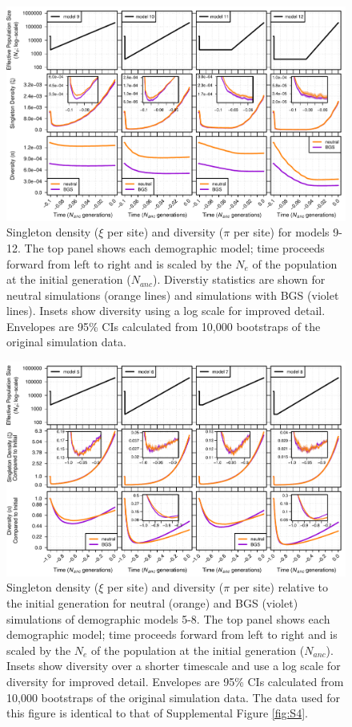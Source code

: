 \documentclass[9pt,twocolumn,twoside]{rilabRxiv}
\begin{document}
\begin{figure}[t]
\includegraphics[width=\linewidth]{figures/FigS5.pdf}
\caption{Singleton density ($\xi$ per site) and diversity ($\pi$ per site) for models 9-12.
The top panel shows each demographic model; time proceeds forward from left to right and is scaled by the $N_e$ of the population at the initial generation ($N_{anc}$).
Diverstiy statistics are shown for neutral simulations (orange lines) and simulations with BGS (violet lines).
Insets show diversity using a log scale for improved detail.
Envelopes are 95\% CIs calculated from 10,000 bootstraps of the original simulation data.}
\label{fig:S5}
\end{figure}
\pagebreak

\begin{figure}[h!]
\includegraphics[width=0.8\linewidth]{figures/FigS7.pdf}
\caption{Singleton density ($\xi$ per site) and diversity ($\pi$ per site) relative to the initial generation for neutral (orange) and BGS (violet) simulations of demographic models 5-8.
The top panel shows each demographic model; time proceeds forward from left to right and is scaled by the $N_e$ of the population at the initial generation ($N_{anc}$).
Insets show diversity over a shorter timescale and use a log scale for diversity for improved detail.
Envelopes are 95\% CIs calculated from 10,000 bootstraps of the original simulation data.
The data used for this figure is identical to that of Supplemental Figure \ref{fig:S4}.}
\label{fig:S7}
\end{figure}
\pagebreak
\end{document}
